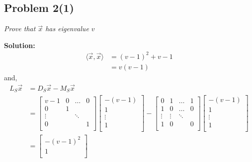 \documentclass[12pt,a4paper]{article}
\newcommand{\solution}{\noindent\textbf{Solution:}\\\indent}
\begin{document}
\newpage
\subsection*{Problem 2(1)}
\textit{
    Prove that $\vec{x}$ has eigenvalue $v$
}

\solution
\begin{align*}
    \langle \vec{x}, \vec{x} \rangle &= (v-1)^2 + v - 1 \\
                                     &= v(v-1)
\end{align*}
and,
\begin{align*}
    L_S\vec{x} &= D_S\vec{x} - M_S\vec{x} \\
               &= \begin{bmatrix}
                  v-1 & 0 & \hdots & 0\\
                  0   & 1 &        & \\
                  \vdots & & \ddots &  \\
                  0      & & & 1 \\ 
                  \end{bmatrix}\begin{bmatrix}
                  -(v-1) \\
                  1 \\
                  \vdots \\
                  1 \\
                  \end{bmatrix} - \begin{bmatrix}
                  0 & 1 & \hdots & 1 \\
                  1 & 0 & \hdots & 0 \\
                  \vdots & \vdots & \ddots & \\
                  1 & 0 & & 0 \\
                  \end{bmatrix}\begin{bmatrix}
                  -(v-1) \\
                  1 \\
                  \vdots \\
                  1 \\
                  \end{bmatrix} \\
              &= \begin{bmatrix}
                  -(v-1)^2 \\
                  1 \\

\end{bmatrix}
\end{align*}
\end{document}
